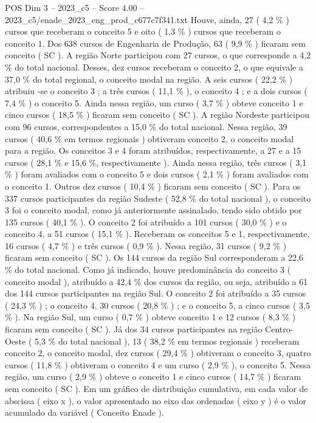 \begin{textsample}{POS Dim 3 – 2023\_c5 – Score 4.00 – 2023\_c5/enade\_2023\_eng\_prod\_c677c7f341.txt}
Houve, ainda, 27 ( 4,2 \% ) cursos que receberam o conceito 5 e oito ( 1,3 \% ) cursos que receberam o conceito 1.
Dos 638 cursos de Engenharia de Produção, 63 ( 9,9 \% ) ficaram sem conceito ( SC ).
A região Norte participou com 27 cursos, o que corresponde a 4,2 \% do total nacional.
Desses, dez cursos receberam o conceito 2, o que equivale a 37,0 \% do total regional, o conceito modal na região.
A seis cursos ( 22,2 \% ) atribuiu -se o conceito 3 ; a três cursos ( 11,1 \% ), o conceito 4 ; e a dois cursos ( 7,4 \% ) o conceito 5.
Ainda nessa região, um curso ( 3,7 \% ) obteve conceito 1 e cinco cursos ( 18,5 \% ) ficaram sem conceito ( SC ).
A região Nordeste participou com 96 cursos, correspondentes a 15,0 \% do total nacional.
Nessa região, 39 cursos ( 40,6 \% em termos regionais ) obtiveram conceito 2, o conceito modal para a região.
Os conceitos 3 e 4 foram atribuídos, respectivamente, a 27 e a 15 cursos ( 28,1 \% e 15,6 \%, respectivamente ).
Ainda nessa região, três cursos ( 3,1 \% ) foram avaliados com o conceito 5 e dois cursos ( 2,1 \% ) foram avaliados com o conceito 1.
Outros dez cursos ( 10,4 \% ) ficaram sem conceito ( SC ).
Para os 337 cursos participantes da região Sudeste ( 52,8 \% do total nacional ), o conceito 3 foi o conceito modal, como já anteriormente assinalado, tendo sido obtido por 135 cursos ( 40,1 \% ).
O conceito 2 foi atribuído a 101 cursos ( 30,0 \% ) e o conceito 4, a 51 cursos ( 15,1 \% ).
Receberam os conceitos 5 e 1, respectivamente, 16 cursos ( 4,7 \% ) e três cursos ( 0,9 \% ).
Nessa região, 31 cursos ( 9,2 \% ) ficaram sem conceito ( SC ).
Os 144 cursos da região Sul corresponderam a 22,6 \% do total nacional.
Como já indicado, houve predominância do conceito 3 ( conceito modal ), atribuído a 42,4 \% dos cursos da região, ou seja, atribuído a 61 dos 144 cursos participantes na região Sul.
O conceito 2 foi atribuído a 35 cursos ( 24,3 \% ) ; o conceito 4, 30 cursos ( 20,8 \% ) ; e o conceito 5, a cinco cursos ( 3,5 \% ).
Na região Sul, um curso ( 0,7 \% ) obteve conceito 1 e 12 cursos ( 8,3 \% ) ficaram sem conceito ( SC ).
Já dos 34 cursos participantes na região Centro-Oeste ( 5,3 \% do total nacional ), 13 ( 38,2 \% em termos regionais ) receberam conceito 2, o conceito modal, dez cursos ( 29,4 \% ) obtiveram o conceito 3, quatro cursos ( 11,8 \% ) obtiveram o conceito 4 e um curso ( 2,9 \% ), o conceito 5.
Nessa região, um curso ( 2,9 \% ) obteve o conceito 1 e cinco cursos ( 14,7 \% ) ficaram sem conceito ( SC ).
Em um gráfico de distribuição cumulativa, em cada valor de abscissa ( eixo x ), o valor apresentado no eixo das ordenadas ( eixo y ) é o valor acumulado da variável ( Conceito Enade ).

\end{textsample}
